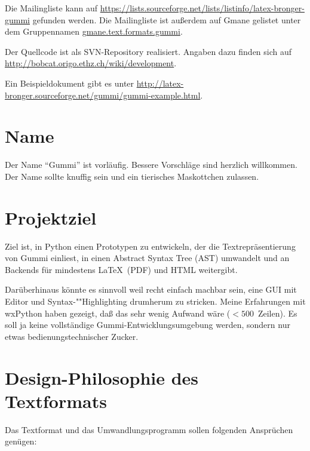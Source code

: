 \documentclass[12pt,openany]{book}
\begin{document}
Die Mailingliste kann auf
\url{https://lists.sourceforge.net/lists/listinfo/latex-bronger-gummi} gefunden
werden.  Die Mailingliste ist außerdem auf Gmane gelistet unter dem
Gruppennamen \url{gmane.text.formats.gummi}.

Der Quellcode ist als SVN-Repository realisiert.  Angaben dazu finden sich auf
\url{http://bobcat.origo.ethz.ch/wiki/development}.

Ein Beispieldokument gibt es unter
\url{http://latex-bronger.sourceforge.net/gummi/gummi-example.html}.

\section{Name}

Der Name "`Gummi"' ist vorläufig.  Bessere Vorschläge sind herzlich willkommen.
Der Name sollte knuffig sein und ein tierisches Maskottchen zulassen.


\section{Projektziel}

Ziel ist, in Python einen Prototypen zu entwickeln, der die Textrepräsentierung
von Gummi einliest, in einen Abstract Syntax Tree (AST) umwandelt und an
Backends für mindestens \LaTeX\ (PDF) und HTML weitergibt.

Darüberhinaus könnte es sinnvoll weil recht einfach machbar sein, eine GUI mit
Editor und Syn\-tax-""High\-ligh\-ting drumherum zu stricken.  Meine
Erfahrungen mit wxPython haben gezeigt, daß das sehr wenig Aufwand wäre
($<500$~Zeilen).  Es soll ja keine vollständige Gummi-Entwicklungsumgebung
werden, sondern nur etwas bedienungstechnischer Zucker.


\section{Design-Philosophie des Textformats}

Das Textformat und das Umwandlungsprogramm sollen folgenden Ansprüchen genügen:
\end{document}

